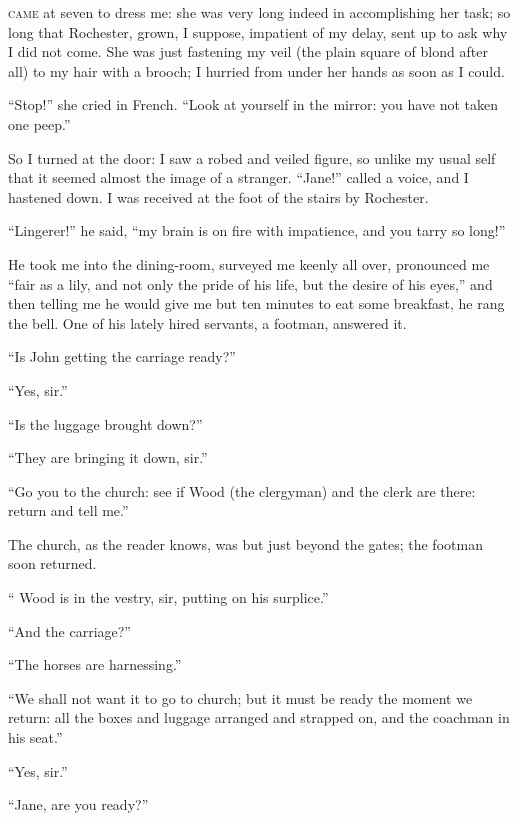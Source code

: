 
 \textsc{came} at seven to dress me: she was very long indeed in
accomplishing her task; so long that \Mr{} Rochester, grown, I suppose,
impatient of my delay, sent up to ask why I did not come. She was just
fastening my veil (the plain square of blond after all) to my hair with
a brooch; I hurried from under her hands as soon as I could.

\enquote{Stop!} she cried in French. \enquote{Look at yourself in the
	mirror: you have not taken one peep.}

So I turned at the door: I saw a robed and veiled figure, so unlike my
usual self that it seemed almost the image of a stranger.
\enquote{Jane!} called a voice, and I hastened down. I was received at
the foot of the stairs by \Mr{} Rochester.

\enquote{Lingerer!} he said, \enquote{my brain is on fire with
	impatience, and you tarry so long!}

He took me into the dining-room, surveyed me keenly all over, pronounced
me \enquote{fair as a lily, and not only the pride of his life, but the
	desire of his eyes,} and then telling me he would give me but ten
minutes to eat some breakfast, he rang the bell. One of his lately
hired servants, a footman, answered it.

\enquote{Is John getting the carriage ready?}

\enquote{Yes, sir.}

\enquote{Is the luggage brought down?}

\enquote{They are bringing it down, sir.}

\enquote{Go you to the church: see if \Mr{} Wood (the clergyman) and the
	clerk are there: return and tell me.}

The church, as the reader knows, was but just beyond the gates; the
footman soon returned.

\enquote{\Mr{} Wood is in the vestry, sir, putting on his surplice.}

\enquote{And the carriage?}

\enquote{The horses are harnessing.}

\enquote{We shall not want it to go to church; but it must be ready the
	moment we return: all the boxes and luggage arranged and strapped on,
	and the coachman in his seat.}

\enquote{Yes, sir.}

\enquote{Jane, are you ready?}

